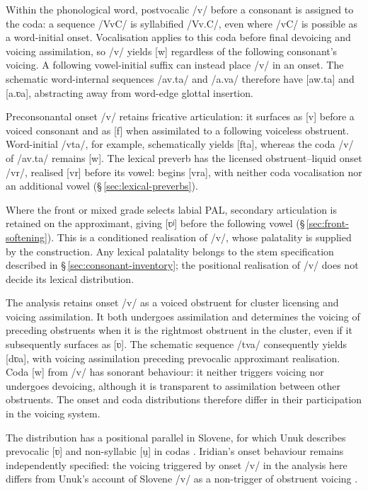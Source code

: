 Within the phonological word, postvocalic /v/ before a consonant is assigned
to the coda: a sequence /VvC/ is syllabified /Vv.C/, even where /vC/ is
possible as a word-initial onset. Vocalisation applies to this coda before
final devoicing and voicing assimilation, so /v/ yields [w] regardless of
the following consonant's voicing. A following vowel-initial suffix can
instead place /v/ in an onset. The schematic word-internal sequences /av.ta/ and /a.va/
therefore have [aw.ta] and [a.ʋa], abstracting away from word-edge
glottal insertion.

Preconsonantal onset /v/ retains fricative articulation: it surfaces as [v]
before a voiced consonant and as [f] when assimilated to a following
voiceless obstruent. Word-initial /vta/, for example, schematically yields
[fta], whereas the coda /v/ of /av.ta/ remains [w]. The lexical preverb
 has the licensed obstruent--liquid onset /vr/, realised [vr]
before its vowel:   begins
[vra], with neither coda vocalisation nor an additional vowel
(§\,\ref{sec:lexical-preverbs}).

Where the front or mixed grade selects labial PAL, secondary articulation is retained
on the approximant, giving [ʋʲ] before the following vowel
(§\,\ref{sec:front-softening}). This is a conditioned realisation of /v/,
whose palatality is supplied by the construction. Any lexical palatality
belongs to the stem specification described in §\,\ref{sec:consonant-inventory};
the positional realisation of /v/ does not decide its lexical distribution.

The analysis retains onset /v/ as a voiced obstruent for cluster licensing
and voicing assimilation. It both undergoes assimilation and determines the
voicing of preceding obstruents when it is the rightmost obstruent in the
cluster, even if it subsequently surfaces as [ʋ]. The schematic sequence
/tva/ consequently yields [dʋa], with voicing assimilation preceding
prevocalic approximant realisation. Coda [w] from /v/ has sonorant behaviour:
it neither triggers voicing nor undergoes devoicing, although it is
transparent to assimilation between other obstruents. The onset and coda
distributions therefore differ in their participation in the voicing system.

The distribution has a positional parallel in Slovene, for which Unuk
describes prevocalic [ʋ] and non-syllabic [u̯] in codas
\cite{unuk2023}. Iridian's onset behaviour remains independently
specified: the voicing triggered by onset /v/ in the analysis here differs
from Unuk's account of Slovene /v/ as a non-trigger of obstruent voicing
\cite{unuk2023}.

